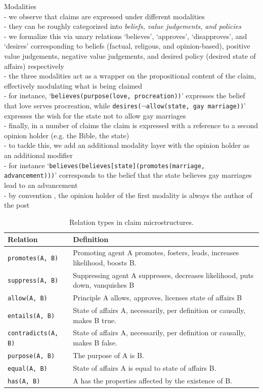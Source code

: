 \noindent Modalities \\
- we observe that claims are expressed under different modalities \\
- they can be roughly categorized into \textit{beliefs, value judgements, and policies} \\
- we formalize this via unary relations `believes', `approves', `disapproves', and `desires' corresponding 
to beliefs (factual, religous, and opinion-based), positive value judgements, negative value 
judgements, and desired policy (desired state of affairs) respectively \\
- the three modalities act as a wrapper on the propositional content of the claim, 
effectively modulating what is being claimed \\
- for instance, `\texttt{believes(purpose(love, procreation))}' expresses the belief 
that love serves procreation, while \texttt{desires(}$\neg$\texttt{allow(state, gay marriage))}'
expresses the wish for the state not to allow gay marriages \\
- finally, in a number of claims the claim is expressed with a reference to a second
opinion holder (e.g. the Bible, the state) \\
- to tackle this, we add an additional modality layer with the opinion holder as
an additional modifier \\
- for instance `\texttt{believes(believes[state](promotes(marriage, advancement)))}' corresponds
to the belief that the state believes gay marriages lead to an advancement \\
- by convention , the opinion holder of the first modality is always the author of the post \\

\begin{table}
{\footnotesize
\begin{tabular}{lp{}}
\toprule
\textbf{Relation} & \textbf{Definition} \\
\midrule
\texttt{promotes(A, B)} & Promoting agent A promotes, fosters, leads, increases likelihood, boosts B.  \\
\texttt{suppress(A, B)} & Suppressing agent A suppresses, decreases likelihood, puts down, vanquishes B \\
\midrule
\texttt{allow(A, B)} & Principle A allows, approves, licenses state of affairs B \\
\midrule
\texttt{entails(A, B)} & State of affairs A, necessarily, per definition or causally, makes B true. \\
\texttt{contradicts(A, B)} & State of affairs A, necessarily, per definition or causally, makes B false. \\
\midrule
\texttt{purpose(A, B)} & The purpose of A is B. \\
\midrule
\texttt{equal(A, B)} & State of affairs A is equal to state of affairs B. \\
\midrule
\texttt{has(A, B)} & A has the properties affected by the existence of B.  \\
\bottomrule
\end{tabular}}
\caption{Relation types in claim microstructures.}
\label{tab:microstructures_relations}
\end{table}

